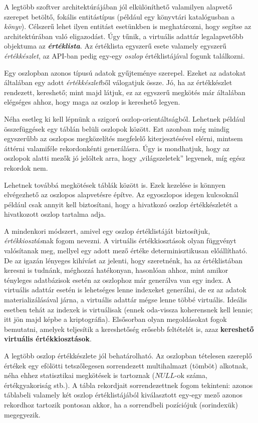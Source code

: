 \documentclass[
    parspace,
    noindent,
    nohyp,
]{elteiktdk}[2023/04/10]
\begin{document}
A legtöbb szoftver architektúrájában jól elkülöníthető valamilyen
alapvető szerepet betöltő, fokális entitástípus
(például egy könyvtári katalógusban a \textit{könyv}).
Célszerű lehet ilyen entitást esetünkben is meghatározni,
hogy segítse az architektúrában való eligazodást.
Úgy tűnik, a virtuális adattár legalapvetőbb objektuma az \textbf{\textit{értéklista}}.
Az értéklista egyszerű esete valamely egyszerű \textit{értékkészlet},
az API-ban pedig egy-egy \textit{oszlop} értéklistájával fogunk találkozni.

Egy oszlopban azonos típusú adatok gyűjteménye szerepel.
Ezeket az adatokat általában egy adott \textit{értékkészlet}ből válogatjuk össze.
Jó, ha az értékkészlet rendezett, kereshető;
mint majd látjuk, ez az egyszerű megkötés már általában elégséges ahhoz,
hogy maga az oszlop is kereshető legyen.

Néha esetleg ki kell lépnünk a szigorú oszlop-orientáltságból.
Lehetnek például összefüggések egy táblán belüli oszlopok között.
Ezt azonban még mindig egyszerűbb az oszlopos megközelítés megfelelő kiterjesztésével elérni,
mintsem áttérni valamiféle rekordonkénti generálásra.
Úgy is mondhatjuk, hogy az oszlopok alatti mezők jó jelöltek arra, hogy „világszeletek” legyenek,
míg egész rekordok nem.

Lehetnek továbbá megkötések táblák között is.
Ezek kezelése is könnyen elvégezhető az oszlopos alapvetésre építve.
Az egyoszlopos idegen kulcsoknál például csak annyit kell biztosítani,
hogy a hivatkozó oszlop értékkészletét a hivatkozott oszlop tartalma adja.

A mindenkori módszert, amivel egy oszlop értéklistáját biztosítjuk,
\textit{értékkiosztás}nak fogom nevezni.
A virtuális értékkiosztások olyan függvényt valósítanak meg,
mellyel egy adott mező értéke determinisztikusan előállítható.
De az igazán lényeges kihívást az jelenti, hogy szeretnénk,
ha az értéklistában keresni is tudnánk, méghozzá hatékonyan,
hasonlóan ahhoz, mint amikor tényleges adatbázisok esetén
az oszlophoz már generálva van egy index.
A virtuális adattár esetén is lehetséges lenne indexeket generálni,
de ez az adatok materializálásával járna,
a virtuális adattár mégse lenne többé virtuális.
Ideális esetben tehát az indexek is virtuálisak
(ennek oda-vissza koherensnek kell lennie; itt jön majd képbe a kriptográfia).
Elsősorban olyan megoldásokat fogok bemutatni,
amelyek teljesítik a kereshetőség erősebb feltételét is,
azaz \textbf{kereshető virtuális értékkiosztások}.

A legtöbb oszlop értékkészlete jól behatárolható.
Az oszlopban tételesen szereplő értékek egy efölötti
tetszőlegesen sorrendezett multihalmazt (tömböt) alkotnak,
néha ehhez statisztikai megkötések is tartoznak ($NULL$-ok száma, értékgyakoriság stb.).
A tábla rekordjait sorrendezettnek fogom tekinteni:
azonos táblabeli valamely két oszlop értéklistájából kiválasztott egy-egy mező
azonos rekordhoz tartozik pontosan akkor, ha a sorrendbeli pozíciójuk (sorindexük) megegyezik.
\end{document}
